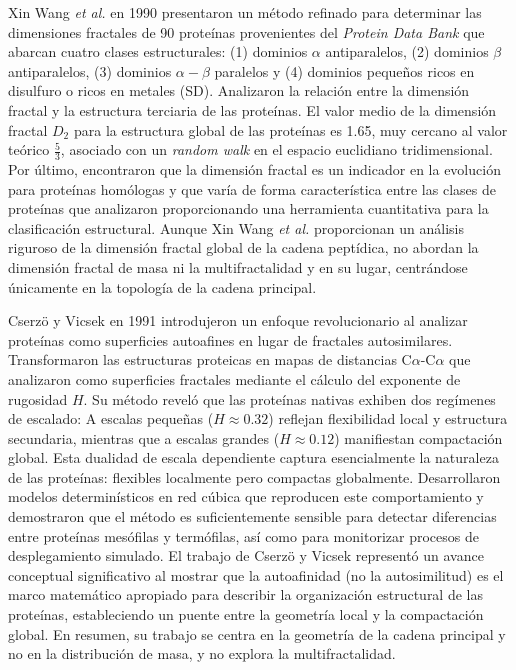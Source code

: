 Xin Wang \textit{et al.} \cite{Wang1990} en 1990 presentaron un m\'{e}todo refinado para determinar las dimensiones fractales de 90 prote\'{i}nas provenientes del \textit{Protein Data Bank} que abarcan cuatro clases estructurales: (1) dominios $\alpha$ antiparalelos, (2) dominios $\beta$ antiparalelos, (3) dominios $\alpha-\beta$ paralelos y (4) dominios pequeños ricos en disulfuro o ricos en metales (SD). Analizaron la relaci\'{o}n entre la dimensi\'{o}n fractal y la estructura terciaria de las prote\'{i}nas. El valor medio de la dimensi\'{o}n fractal $D_{2}$ para la estructura global de las prote\'{i}nas es 1.65, muy cercano al valor te\'{o}rico $\frac{5}{3}$, asociado con un \textit{random walk} en el espacio euclidiano tridimensional. Por \'{u}ltimo, encontraron que la dimensi\'{o}n fractal es un indicador en la evoluci\'{o}n para prote\'{i}nas hom\'{o}logas y que var\'{i}a de forma caracter\'{i}stica entre las clases de prote\'{i}nas que analizaron proporcionando una herramienta cuantitativa para la clasificaci\'{o}n estructural. Aunque Xin Wang \textit{et al.} proporcionan un análisis riguroso de la dimensión fractal global de la cadena peptídica, no abordan la dimensión fractal de masa ni la multifractalidad y en su lugar, centrándose únicamente en la topología de la cadena principal.

Cserzö y Vicsek en 1991 \cite{Cserzo1991} introdujeron un enfoque revolucionario al analizar prote\'{i}nas como superficies autoafines en lugar de fractales autosimilares. Transformaron las estructuras proteicas en mapas de distancias C$\alpha$-C$\alpha$ que analizaron como superficies fractales mediante el c\'{a}lculo del exponente de rugosidad $H$. Su m\'{e}todo revel\'{o} que las prote\'{i}nas nativas exhiben dos reg\'{i}menes de escalado: A escalas pequeñas ($H \approx 0.32$) reflejan flexibilidad local y estructura secundaria, mientras que a escalas grandes ($H \approx 0.12$) manifiestan compactaci\'{o}n global. Esta dualidad de escala dependiente captura esencialmente la naturaleza de las prote\'{i}nas: flexibles localmente pero compactas globalmente. Desarrollaron modelos determin\'{i}sticos en red c\'{u}bica que reproducen este comportamiento y demostraron que el m\'{e}todo es suficientemente sensible para detectar diferencias entre prote\'{i}nas mes\'{o}filas y term\'{o}filas, as\'{i} como para monitorizar procesos de desplegamiento simulado. El trabajo de Cserzö y Vicsek represent\'{o} un avance conceptual significativo al mostrar que la autoafinidad (no la autosimilitud) es el marco matem\'{a}tico apropiado para describir la organizaci\'{o}n estructural de las prote\'{i}nas, estableciendo un puente entre la geometr\'{i}a local y la compactaci\'{o}n global.  En resumen, su trabajo se centra en la geometría de la cadena principal y no en la distribución de masa, y no explora la multifractalidad.


